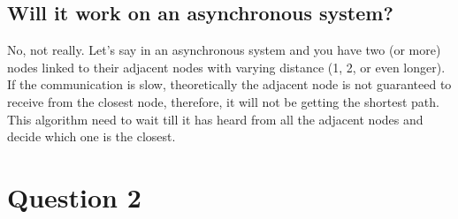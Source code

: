 \documentclass[12pt,letterpaper]{article}
\begin{document}
\subsection* {Will it work on an asynchronous system?}
No, not really. Let's say in an asynchronous system and you have two (or more) nodes linked to their adjacent nodes with varying distance (1, 2, or even longer). If the communication is slow, theoretically the adjacent node is not guaranteed to receive from the closest node, therefore, it will not be getting the shortest path. This algorithm need to wait till it has heard from all the adjacent nodes and decide which one is the closest.
\newpage

\section*{Question 2}
\end{document}
